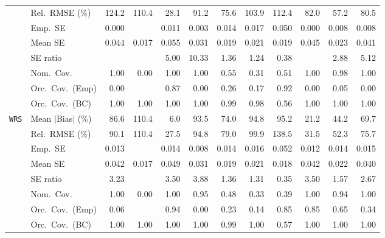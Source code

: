\begin{landscape}
\begin{longtable}{llrrrrrrrrrr}
 & Rel.\ RMSE (\%) & 124.2 & 110.4 & \cellcolor{rankone}28.1 & 91.2 & \cellcolor{rankthree}75.6 & 103.9 & 112.4 & 82.0 & \cellcolor{ranktwo}57.2 & 80.5 \\
 & Emp.\ SE & 0.000 &  & 0.011 & 0.003 & 0.014 & 0.017 & 0.050 & 0.000 & 0.008 & 0.008 \\
 & Mean SE & 0.044 & 0.017 & 0.055 & 0.031 & 0.019 & 0.021 & 0.019 & 0.045 & 0.023 & 0.041 \\
 & SE ratio &  &  & 5.00 & 10.33 & \cellcolor{ranktwo}1.36 & \cellcolor{rankone}1.24 & \cellcolor{rankthree}0.38 &  & 2.88 & 5.12 \\
 & Nom.\ Cov. & \cellcolor{ranktwo}1.00 & 0.00 & \cellcolor{rankthree}1.00 & 1.00 & 0.55 & 0.31 & 0.51 & 1.00 & \cellcolor{rankone}0.98 & 1.00 \\
 & Orc.\ Cov.\ (Emp) & 0.00 &  & \cellcolor{ranktwo}0.87 & 0.00 & \cellcolor{rankthree}0.26 & 0.17 & \cellcolor{rankone}0.92 & 0.00 & 0.05 & 0.00 \\
 & Orc.\ Cov.\ (BC) & \cellcolor{rankthree}1.00 & 1.00 & 1.00 & 1.00 & \cellcolor{ranktwo}0.99 & \cellcolor{rankone}0.98 & 0.56 & 1.00 & 1.00 & 1.00 \\
\addlinespace[2pt]
\quad \texttt{WRS} & Mean $|$Bias$|$ (\%) & 86.6 & 110.4 & \cellcolor{rankone}6.0 & 93.5 & 74.0 & 94.8 & 95.2 & \cellcolor{ranktwo}21.2 & \cellcolor{rankthree}44.2 & 69.7 \\
 & Rel.\ RMSE (\%) & 90.1 & 110.4 & \cellcolor{rankone}27.5 & 94.8 & 79.0 & 99.9 & 138.5 & \cellcolor{ranktwo}31.5 & \cellcolor{rankthree}52.3 & 75.7 \\
 & Emp.\ SE & 0.013 &  & 0.014 & 0.008 & 0.014 & 0.016 & 0.052 & 0.012 & 0.014 & 0.015 \\
 & Mean SE & 0.042 & 0.017 & 0.049 & 0.031 & 0.019 & 0.021 & 0.018 & 0.042 & 0.022 & 0.040 \\
 & SE ratio & 3.23 &  & 3.50 & 3.88 & \cellcolor{ranktwo}1.36 & \cellcolor{rankone}1.31 & 0.35 & 3.50 & \cellcolor{rankthree}1.57 & 2.67 \\
 & Nom.\ Cov. & 1.00 & 0.00 & 1.00 & \cellcolor{rankone}0.95 & 0.48 & 0.33 & 0.39 & 1.00 & \cellcolor{ranktwo}0.94 & \cellcolor{rankthree}1.00 \\
 & Orc.\ Cov.\ (Emp) & 0.06 &  & \cellcolor{rankone}0.94 & 0.00 & 0.23 & 0.14 & \cellcolor{rankthree}0.85 & \cellcolor{ranktwo}0.85 & 0.65 & 0.34 \\
 & Orc.\ Cov.\ (BC) & \cellcolor{rankthree}1.00 & 1.00 & 1.00 & 1.00 & \cellcolor{rankone}0.99 & 1.00 & 0.57 & 1.00 & \cellcolor{ranktwo}1.00 & 1.00 \\

\end{longtable}
\end{landscape}
